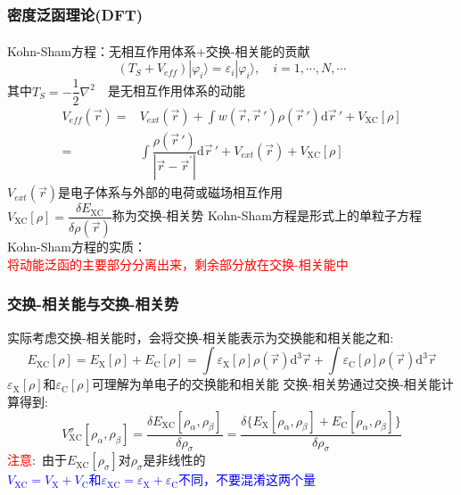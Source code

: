 \documentclass[cjk,slidestop,compress,mathserif,blue]{beamer}
\newcommand{\upcite}[1]{\hspace{0ex}\textsuperscript{\cite{#1}}} %
\begin{document}
\frame                               %
{
\frametitle{密度泛函理论(\textrm{DFT})}
\textrm{Kohn-Sham}方程\upcite{PR140-A1133_1965}：无相互作用体系+交换-相关能的贡献
$$(T_S+V_{e\!f\!f})|\varphi_i\rangle=\varepsilon_i|\varphi_i\rangle,\quad i=1,\cdots,N,\cdots$$
其中$T_S=-\dfrac12\nabla^2$~~是无相互作用体系的动能
\begin{displaymath}
	\begin{aligned}
		V_{e\!f\!f}(\vec r)=&V_{ext}(\vec r)+\displaystyle\int w(\vec r,\vec r\,')\rho(\vec r\,')\mathrm{d}\vec r\,'+V_{\mathrm{XC}}[\rho]\\
=&\displaystyle\int\dfrac{\rho(\vec r\,')}{|\vec r-\vec r^{\prime}|}\mathrm{d}\vec r\,'+V_{ext}(\vec r)+V_{\mathrm{XC}}[\rho]
	\end{aligned}
\end{displaymath}
$V_{ext}(\vec r)$是电子体系与外部的电荷或磁场相互作用\\
$V_{\mathrm{XC}}[\rho]=\dfrac{\delta E_{\mathrm{XC}}}{\delta\rho(\vec r)}$称为交换-相关势
\vskip 10pt
\textrm{Kohn-Sham}方程是形式上的单粒子方程
\vskip 6pt
\textrm{Kohn-Sham}方程的实质：\\\textcolor{red}{将动能泛函的主要部分分离出来，剩余部分放在交换-相关能中}
}

\frame
{
\frametitle{交换-相关能与交换-相关势}
实际考虑交换-相关能时，会将交换-相关能表示为交换能和相关能之和:
\begin{displaymath}
	E_{\mathrm{XC}}[\rho]=E_{\mathrm{X}}[\rho]+E_{\mathrm{C}}[\rho]=\int\varepsilon_{\mathrm{X}}[\rho]\rho(\vec{r}) \textrm{d}^3\vec{r}+\int\varepsilon_{\mathrm{C}}[\rho]\rho(\vec{r}) \textrm{d}^3\vec{r}
\end{displaymath}
$\varepsilon_{\mathrm{X}}[\rho]$和$\varepsilon_{\mathrm{C}}[\rho]$可理解为单电子的交换能和相关能
\vskip 20pt
交换-相关势通过交换-相关能计算得到:~
		\begin{displaymath}
			V_{\mathrm{XC}}^{\sigma}[\rho_{\alpha},\rho_{\beta}]=\dfrac{\delta E_{\mathrm{XC}}[\rho_{\alpha},\rho_{\beta}]}{\delta\rho_{\sigma}}=\dfrac{\delta\{E_{\mathrm{X}}[\rho_{\alpha},\rho_{\beta}]+E_{\mathrm{C}}[\rho_{\alpha},\rho_{\beta}]\}}{\delta\rho_{\sigma}}
		\end{displaymath}
		\textcolor{red}{注意}:~由于$E_{\mathrm{XC}}[\rho_{\sigma}]$对$\rho_{\sigma}$是非线性的\\
		\textcolor{blue}{$V_{\mathrm{XC}}=V_{\mathrm{X}}+V_{\mathrm{C}}$和$\varepsilon_{\mathrm{XC}}=\varepsilon_{\mathrm{X}}+\varepsilon_{\mathrm{C}}$不同，不要混淆这两个量}
}
\end{document}
